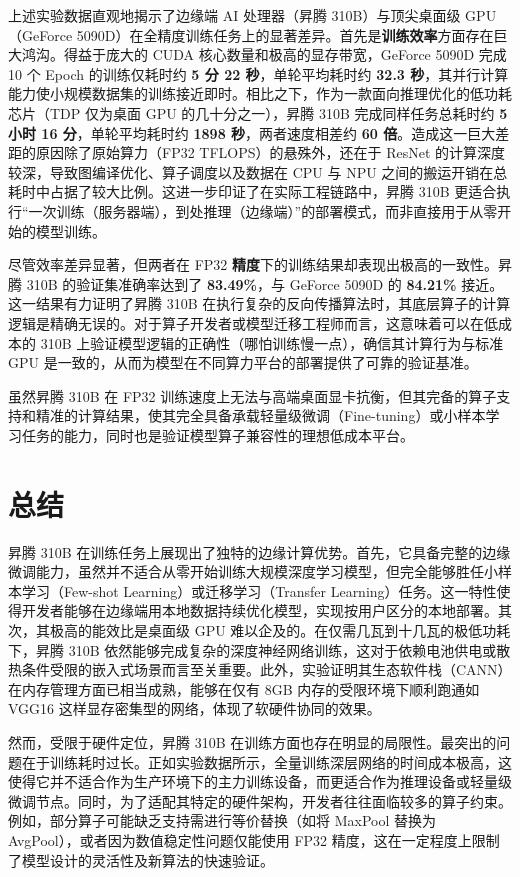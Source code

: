 上述实验数据直观地揭示了边缘端 AI 处理器（昇腾 310B）与顶尖桌面级
GPU（GeForce
5090D）在全精度训练任务上的显著差异。首先是\textbf{训练效率}方面存在巨大鸿沟。得益于庞大的
CUDA 核心数量和极高的显存带宽，GeForce 5090D 完成 10 个 Epoch
的训练仅耗时约 \textbf{5 分 22 秒}，单轮平均耗时约 \textbf{32.3
秒}，其并行计算能力使小规模数据集的训练接近即时。相比之下，作为一款面向推理优化的低功耗芯片（TDP
仅为桌面 GPU 的几十分之一），昇腾 310B 完成同样任务总耗时约 \textbf{5
小时 16 分}，单轮平均耗时约 \textbf{1898 秒}，两者速度相差约 \textbf{60
倍}。造成这一巨大差距的原因除了原始算力（FP32 TFLOPS）的悬殊外，还在于
ResNet 的计算深度较深，导致图编译优化、算子调度以及数据在 CPU 与 NPU
之间的搬运开销在总耗时中占据了较大比例。这进一步印证了在实际工程链路中，昇腾
310B
更适合执行``一次训练（服务器端），到处推理（边缘端）''的部署模式，而非直接用于从零开始的模型训练。

尽管效率差异显著，但两者在 FP32
\textbf{精度}下的训练结果却表现出极高的一致性。昇腾 310B
的验证集准确率达到了 \textbf{83.49\%}，与 GeForce 5090D 的
\textbf{84.21\%} 接近。这一结果有力证明了昇腾 310B
在执行复杂的反向传播算法时，其底层算子的计算逻辑是精确无误的。对于算子开发者或模型迁移工程师而言，这意味着可以在低成本的
310B 上验证模型逻辑的正确性（哪怕训练慢一点），确信其计算行为与标准 GPU
是一致的，从而为模型在不同算力平台的部署提供了可靠的验证基准。

虽然昇腾 310B 在 FP32
训练速度上无法与高端桌面显卡抗衡，但其完备的算子支持和精准的计算结果，使其完全具备承载轻量级微调（Fine-tuning）或小样本学习任务的能力，同时也是验证模型算子兼容性的理想低成本平台。

\section{总结}\label{src-book-chapter3-h32}

昇腾 310B
在训练任务上展现出了独特的边缘计算优势。首先，它具备完整的边缘微调能力，虽然并不适合从零开始训练大规模深度学习模型，但完全能够胜任小样本学习（Few-shot
Learning）或迁移学习（Transfer
Learning）任务。这一特性使得开发者能够在边缘端用本地数据持续优化模型，实现按用户区分的本地部署。其次，其极高的能效比是桌面级
GPU 难以企及的。在仅需几瓦到十几瓦的极低功耗下，昇腾 310B
依然能够完成复杂的深度神经网络训练，这对于依赖电池供电或散热条件受限的嵌入式场景而言至关重要。此外，实验证明其生态软件栈（CANN）在内存管理方面已相当成熟，能够在仅有
8GB 内存的受限环境下顺利跑通如 VGG16
这样显存密集型的网络，体现了软硬件协同的效果。

然而，受限于硬件定位，昇腾 310B
在训练方面也存在明显的局限性。最突出的问题在于训练耗时过长。正如实验数据所示，全量训练深层网络的时间成本极高，这使得它并不适合作为生产环境下的主力训练设备，而更适合作为推理设备或轻量级微调节点。同时，为了适配其特定的硬件架构，开发者往往面临较多的算子约束。例如，部分算子可能缺乏支持需进行等价替换（如将
MaxPool 替换为 AvgPool），或者因为数值稳定性问题仅能使用 FP32
精度，这在一定程度上限制了模型设计的灵活性及新算法的快速验证。
